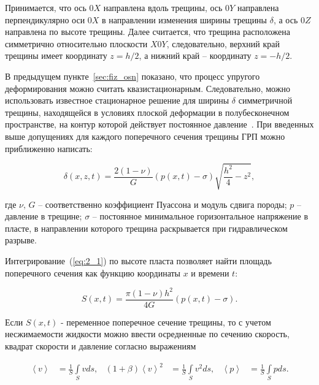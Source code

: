 Принимается, что ось $0X$ направлена вдоль трещины, ось $0Y$ направлена перпендикулярно оси $0X$ в направлении изменения ширины трещины $\delta$, а ось $0Z$ направлена по высоте трещины. Далее считается, что трещина расположена симметрично относительно плоскости $X0Y$, следовательно, верхний край трещины имеет координату $z = h/2$, а нижний край – координату $z = -h/2$.



В предыдущем пункте~\ref{sec:fiz_osn} показано, что процесс упругого деформирования можно считать квазистационарным. Следовательно, можно использовать известное стационарное решение для ширины $\delta$ симметричной трещины, находящейся в условиях плоской деформации в полубесконечном пространстве, на контур которой действует постоянное давление~\cite{Sneddon1}. При введенных выше допущениях для каждого поперечного сечения трещины ГРП можно приближенно написать:

\begin{equation}

\delta \left(x,z,t\right) = \frac{2\left(1-\nu\right)}{G} \left(p\left(x,t\right)-\sigma\right)\sqrt{\frac{h^2}{4}-z^2},\label{eq:2_1}

\end{equation}

где $\nu,\,G$ – соответственно коэффициент Пуассона и модуль сдвига породы; $p$ – давление в трещине; $\sigma$ – постоянное минимальное горизонтальное напряжение в пласте, в направлении которого трещина раскрывается при гидравлическом разрыве.



Интегрирование~(\ref{eq:2_1}) по высоте пласта позволяет найти площадь поперечного сечения как функцию координаты $x$ и времени $t$:

\begin{equation}

S\left(x,t\right) = \frac{\pi\left(1-\nu\right) h^2}{4G} \left(p\left(x,t\right)-\sigma\right).\label{eq:2_2}

\end{equation}

Если $S\left(x,t\right)$ - переменное поперечное сечение трещины, то с учетом несжимаемости жидкости можно ввести осредненные по сечению скорость, квадрат скорости и давление согласно выражениям

\begin{align}

\left\langle v\right\rangle &= \frac{1}{S} \int\limits_{S} vds,& \left(1+\beta\right)\left\langle v\right\rangle^2 &= \frac{1}{S} \int\limits_{S} v^2ds, & 

\left\langle p\right\rangle &= \frac{1}{S} \int\limits_{S} pds. \label{eq:2_3}

\end{align}

